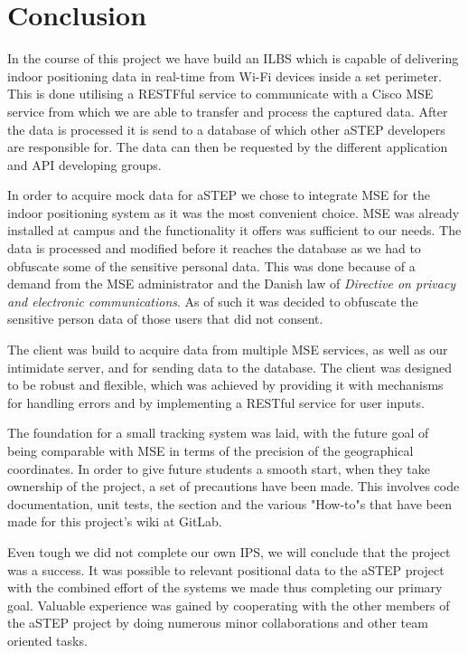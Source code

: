 \chapter{Conclusion}
In the course of this project we have build an ILBS which is capable of delivering indoor positioning data in real-time from Wi-Fi devices inside a set perimeter. This is done utilising a RESTFful service to communicate with a Cisco MSE service from which we are able to transfer and process the captured data. After the data is processed it is send to a database of which other aSTEP developers are responsible for. The data can then be requested by the different application and API developing groups.

In order to acquire mock data for aSTEP we chose to integrate MSE for the indoor positioning system as it was the most convenient choice. MSE was already installed at campus and the functionality it offers was sufficient to our needs. The data is processed and modified before it reaches the database as we had to obfuscate some of the sensitive personal data. This was done because of a demand from the MSE administrator and the Danish law of \textit{Directive on privacy and electronic communications}. As of such it was decided to obfuscate the sensitive person data of those users that did not consent.

The client was build to acquire data from multiple MSE services, as well as our intimidate server, and for sending data to the database. The client was designed to be robust and flexible, which was achieved by providing it with mechanisms for handling errors and by implementing a RESTful service for user inputs.

The foundation for a small tracking system was laid, with the future goal of being comparable with MSE in terms of the precision of the geographical coordinates. %
In order to give future students a smooth start, when they take ownership of the project, a set of precautions have been made. This involves code documentation, unit tests, the section  and the various "How-to"s that have been made for this project's wiki at GitLab. 

Even tough we did not complete our own IPS, we will conclude that the project was a success. It was possible to relevant positional data to the aSTEP project with the combined effort of the systems we made thus completing our primary goal. Valuable experience was gained by cooperating with the other members of the aSTEP project by doing numerous minor collaborations and other team oriented tasks.
